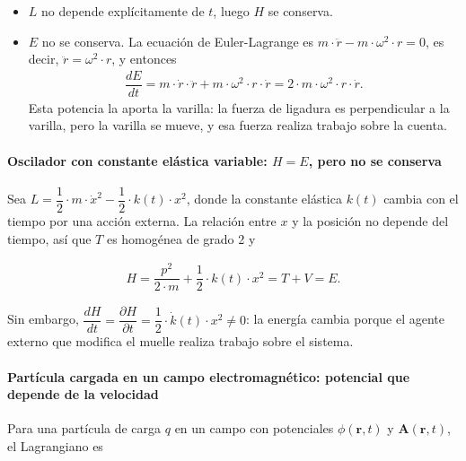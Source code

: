 \documentclass[
  spanish,
]{article}
\providecommand{\tightlist}{%
  \setlength{\itemsep}{0pt}\setlength{\parskip}{0pt}}
\begin{document}
\begin{itemize}
\tightlist
\item
  \(L\) no depende explícitamente de \(t\), luego \(H\) se conserva.
\item
  \(E\) no se conserva. La ecuación de Euler-Lagrange es
  \(m \cdot \ddot{r} - m \cdot \omega^2 \cdot r = 0\), es decir,
  \(\ddot{r} = \omega^2 \cdot r\), y entonces \[
  \begin{aligned}
  \dfrac{dE}{dt} = m \cdot \dot{r} \cdot \ddot{r} + m \cdot \omega^2 \cdot r \cdot \dot{r} = 2 \cdot m \cdot \omega^2 \cdot r \cdot \dot{r}.
  \end{aligned}
  \] Esta potencia la aporta la varilla: la fuerza de ligadura es
  perpendicular a la varilla, pero la varilla se mueve, y esa fuerza
  realiza trabajo sobre la cuenta.
\end{itemize}

\paragraph{\texorpdfstring{Oscilador con constante elástica variable:
\(H = E\), pero no se
conserva}{Oscilador con constante elástica variable: H = E, pero no se conserva}}\label{oscilador-con-constante-eluxe1stica-variable-h-e-pero-no-se-conserva}

Sea
\(L = \dfrac{1}{2} \cdot m \cdot \dot{x}^2 - \dfrac{1}{2} \cdot k(t) \cdot x^2\),
donde la constante elástica \(k(t)\) cambia con el tiempo por una acción
externa. La relación entre \(x\) y la posición no depende del tiempo,
así que \(T\) es homogénea de grado 2 y

\[
\begin{aligned}
H = \dfrac{p^2}{2 \cdot m} + \dfrac{1}{2} \cdot k(t) \cdot x^2 = T + V = E.
\end{aligned}
\]

Sin embargo,
\(\dfrac{dH}{dt} = \dfrac{\partial H}{\partial t} = \dfrac{1}{2} \cdot \dot{k}(t) \cdot x^2 \neq 0\):
la energía cambia porque el agente externo que modifica el muelle
realiza trabajo sobre el sistema.

\paragraph{Partícula cargada en un campo electromagnético: potencial que
depende de la
velocidad}\label{partuxedcula-cargada-en-un-campo-electromagnuxe9tico-potencial-que-depende-de-la-velocidad}

Para una partícula de carga \(q\) en un campo con potenciales
\(\phi(\mathbf{r},t)\) y \(\mathbf{A}(\mathbf{r},t)\), el Lagrangiano es
\end{document}
